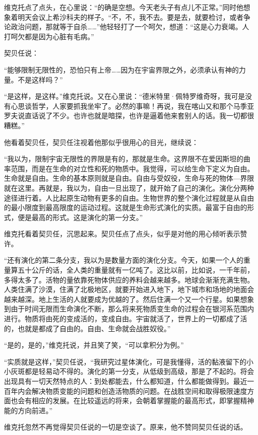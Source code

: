 维克托点了点头，在心里说：“的确是空想。今天老头子有点儿不正常。”同时他想象着明天会议上希沙科夫的样子。“不，不，我不去。要是去，就要检讨，或者争论政治问题，那就等于自杀……”他轻轻打了一个呵欠，想道：“这是心力衰竭。人打呵欠都是因为心脏有毛病。”

契贝任说：

“能够限制无限性的，恐怕只有上帝……因为在宇宙界限之外，必须承认有神的力量。不是这样吗？”

“是这样，是这样。”维克托说。又在心里说：“德米特里·佩特罗维奇呀，我可是没有心思谈哲学，人家要抓我坐牢了。必然的事嘛！再说，我在喀山又和那个马季亚罗夫说直话说了不少。也许也就是暗探，也许是逼着他来套别人的话。我一切都很糟糕。”

他看着契贝任，契贝任注视着他那似乎很用心的目光，继续说：

“我以为，限制宇宙无限性的界限是有的，那就是生命。这界限不在爱因斯坦的曲率范围，而是在生命的对立性和死的物质中。我觉得，可以给生命下定义为自由。生命就是自由。生命的基本原则就是自由。自由与受奴役，生命与死的物体—界限就在这里。再就是，我以为，自由一旦出现了，就开始了自己的演化。演化分两种途径进行着。人比起原生动物有更多的自由。生物世界的整个演化过程就是从自由的最小限度到最高限度的运动过程。这就是生命形式演化的实质。最富于自由的形式，便是最高的形式。这是演化的第一分支。”

维克托看着契贝任，沉思起来。契贝任点了点头，似乎是对他的用心倾听表示赞许。

“还有演化的第二条分支，我以为是数量方面的演化分支。今天，如果一个人的重量算五十公斤的话，全人类的重量就有一亿吨了。这比以前，比如说，一千年前，多得太多了。活物的量依靠死物体供应的养料会越来越多。地球会渐渐充满生物。人类住满了沙漠，住满了北极地区，就要开始进入地下，地下城市和场地的地面会越来越深。地上生活的人就要成为优越的了。然后住满一个又一个行星。如果想象到由于时间无限而生命演化不断，那么将来死物质变生命的过程会在银河系范围内进行。物质将由死的变成活的，变成自由。宇宙就活了，世界上的一切都成了活的，也就是都成了自由的。自由、生命就会战胜奴役。”

“是的，是的，”维克托说，并且笑了笑，“可以拿积分为例。”

“实质就是这样，”契贝任说，“我研究过星体演化，可是我懂得，活的黏液留下的小小灰斑都是轻易动不得的。演化的第一分支，从低级到高级，那是了不起的。将会出现具有一切天然特点的人：到处都能去，什么都知道，什么都能做得到。最近一百年内会解决物质变能的问题和创造活物质的问题。在战胜空间和取得极限速度方面也会有相应的发展。在比较遥远的将来，会朝着掌握能的最高形式，即掌握精神能的方向前进。”

维克托忽然不再觉得契贝任说的一切是空谈了。原来，他不赞同契贝任说的话。

